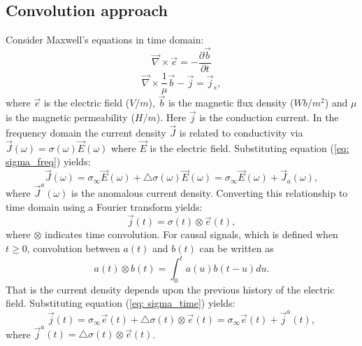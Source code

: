 \documentclass[a4paper, 11pt]{article}
\newcommand{\curl}{{\vec \nabla}\times}
\newcommand {\J}{{\vec J}}
\newcommand {\E}{{\vec E}}
\newcommand{\siginf}{\sigma_\infty}
\newcommand{\dsig}{\triangle\sigma}
\renewcommand {\j}  { {\vec j} }
\renewcommand {\b}  { {\vec b} }
\newcommand {\e}  { {\vec e} }
\begin{document}
\subsection{Convolution approach}
Consider Maxwell's equations in time domain:
\begin{equation}
  \curl{\e} = -\frac{\partial \b}{\partial t}
  \label{eq: total_farad}
\end{equation}
\begin{equation}
  \curl{\frac{1}{\mu}\b} - \j= \j_{s},
  \label{eq: total_coulomb}
\end{equation}
where $\e$ is the electric field ($V/m$), $\b$ is the magnetic flux density ($Wb/m^2$) and $\mu$ is the magnetic permeability ($H/m$). Here $\j$ is the conduction current. In the frequency domain the current density $\J$ is related to conductivity via $\J(\omega) = \sigma(\omega)\E(\omega)$ where $\E$ is the electric field. Substituting equation (\ref{eq: sigma_freq}) yields:
\begin{equation}
	\J(\omega) = \siginf\E(\omega)+\triangle\sigma(\omega)\E(\omega) =\siginf\E(\omega)+\vec{J}_a(\omega),
\end{equation}
where $\J^a(\omega)$ is the anomalous current density.
Converting this relationship to time domain using a Fourier transform yields:
\begin{equation}
	\j(t) = \sigma(t)\otimes \e(t),
	\label{eq: ohmslaw1}
\end{equation}
where $\otimes$ indicates time convolution. For causal signals, which is defined when $t \ge 0$, convolution between $a(t)$ and $b(t)$ can be written as
\begin{equation}
	a(t) \otimes b(t) = \int_0^t a(u) b(t-u) du.
	\label{eq: convolution}
\end{equation}
That is the current density depends upon the previous history of the electric field. Substituting equation (\ref{eq: sigma_time}) yields:
\begin{equation}
	\j(t) = \siginf\e(t) + \dsig(t)\otimes\e(t) = \siginf\e(t) + \j^a(t),
	\label{eq: ohmslaw2}
\end{equation}
where $\j^a(t) = \dsig(t)\otimes\e(t)$.
\end{document}
